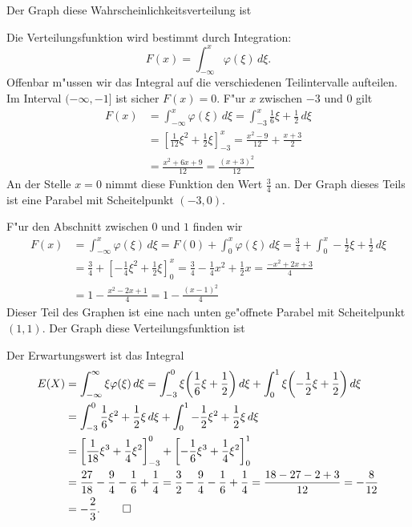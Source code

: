 \begin{loesung}
\begin{teilaufgaben}
\item
Der Graph diese Wahrscheinlichkeitsverteilung ist
\begin{center}
\end{center}
\item Die Verteilungsfunktion wird bestimmt durch Integration:
\[
F(x)=\int_{-\infty}^x\varphi(\xi)\,d\xi.
\]
Offenbar m"ussen wir das Integral auf die verschiedenen Teilintervalle
aufteilen. Im Interval $(-\infty,-1]$ ist sicher $F(x)=0$. F"ur $x$ zwischen
$-3$ und $0$ gilt
\begin{align*}
F(x)&=\int_{-\infty}^x\varphi(\xi)\,d\xi =\int_{-3}^x\frac16\xi+\frac12\,d\xi
\\
&=
\left[\frac1{12}\xi^2+\frac12\xi\right]_{-3}^x=\frac{x^2-9}{12}+\frac{x+3}2
\\
&
=\frac{x^2+6x+9}{12}=\frac{(x+3)^2}{12}
\end{align*}
An der Stelle $x=0$ nimmt diese Funktion den Wert $\frac34$ an.
Der Graph dieses Teils ist eine Parabel mit Scheitelpunkt $(-3,0)$.

F"ur den Abschnitt zwischen $0$ und $1$ finden wir
\begin{align*}
F(x)
&=
\int_{-\infty}^x\varphi(\xi)\,d\xi
=F(0)+\int_0^x\varphi(\xi)\,d\xi
=\frac34+\int_0^x-\frac12\xi+\frac12\,d\xi\\
&=\frac34+\left[-\frac14\xi^2+\frac12\xi\right]_0^x
=\frac34-\frac14x^2+\frac12x
=\frac{-x^2+2x+3}4\\
&=1-\frac{x^2-2x+1}{4}
=1-\frac{(x-1)^2}4
\end{align*}
Dieser Teil des Graphen ist eine nach unten ge"offnete Parabel mit
Scheitelpunkt $(1,1)$.
Der Graph diese Verteilungsfunktion ist
\begin{center}
\end{center}
\item
Der Erwartungswert ist das Integral
\begin{align*}
E(X)&=\int_{-\infty}^\infty\xi\varphi(\xi)\,d\xi
=
\int_{-3}^0\xi\biggl(\frac16\xi+\frac12\biggr)\,d\xi
+\int_0^1\xi\biggl(-\frac12\xi+\frac12\biggr)\,d\xi
\\
&=
\int_{-3}^0\frac16\xi^2+\frac12\xi\,d\xi
+\int_0^1-\frac12\xi^2+\frac12\xi\,d\xi
\\
&=\left[\frac1{18}\xi^3+\frac14\xi^2\right]_{-3}^0
+\left[-\frac16\xi^3+\frac14\xi^2\right]_0^1\\
&=\frac{27}{18}-\frac94-\frac16+\frac14
=\frac{3}{2}-\frac94-\frac16+\frac14
=\frac{18-27-2+3}{12}
=-\frac{8}{12}
\\
&=-\frac23.
\qedhere
\end{align*}
\end{teilaufgaben}
\end{loesung}
